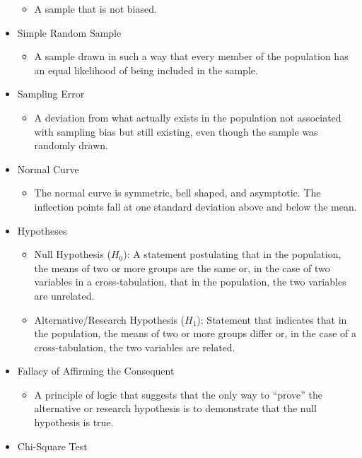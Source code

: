 \documentclass[]{article}
\begin{document}
\begin{itemize}
  \begin{itemize}
  \itemsep1pt\parskip0pt
  \item
    A sample that is not biased.
  \end{itemize}
\item
  Simple Random Sample

  \begin{itemize}
  \itemsep1pt\parskip0pt
  \item
    A sample drawn in such a way that every member of the population has
    an equal likelihood of being included in the sample.
  \end{itemize}
\item
  Sampling Error

  \begin{itemize}
  \itemsep1pt\parskip0pt
  \item
    A deviation from what actually exists in the population not
    associated with sampling bias but still existing, even though the
    sample was randomly drawn.
  \end{itemize}
\item
  Normal Curve

  \begin{itemize}
  \itemsep1pt\parskip0pt
  \item
    The normal curve is symmetric, bell shaped, and asymptotic. The
    inflection points fall at one standard deviation above and below the
    mean.
  \end{itemize}
\item
  Hypotheses

  \begin{itemize}
  \itemsep1pt\parskip0pt
  \item
    Null Hypothesis ($H_0$): A statement postulating that in the
    population, the means of two or more groups are the same or, in the
    case of two variables in a cross-tabulation, that in the population,
    the two variables are unrelated.\\
  \item
    Alternative/Research Hypothesis ($H_1$): Statement that indicates
    that in the population, the means of two or more groups differ or,
    in the case of a cross-tabulation, the two variables are related.
  \end{itemize}
\item
  Fallacy of Affirming the Consequent

  \begin{itemize}
  \itemsep1pt\parskip0pt
  \item
    A principle of logic that suggests that the only way to ``prove''
    the alternative or research hypothesis is to demonstrate that the
    null hypothesis is true.
  \end{itemize}
\item
  Chi-Square Test


\end{itemize}
\end{document}
